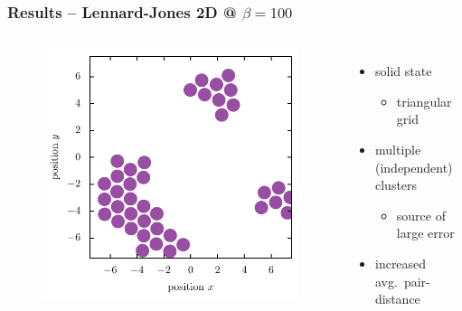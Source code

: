 \documentclass[mathserif,serif]{beamer}
\begin{document}
\begin{frame}
	\frametitle{Results -- Lennard-Jones 2D @ $\beta=100$}
	\centering
	\begin{columns}	
		\begin{figure}
			\includegraphics[width=\textwidth]{../report/figures/Beta_100_LJ.pdf}
		\end{figure}
		\begin{itemize}
			\setlength{\itemsep}{1.5em}
			\item solid state
			\begin{itemize}
				\item triangular grid
			\end{itemize}
			\item multiple (independent) clusters
			\begin{itemize}
				\item source of large error
			\end{itemize}
			\item increased avg.\ pair-distance
		\end{itemize}
	\end{columns}
\end{frame}
\end{document}
